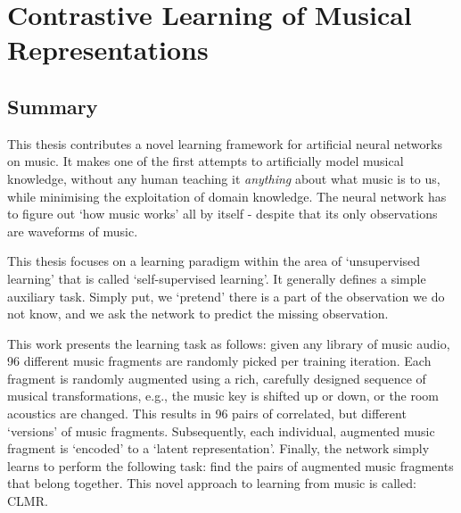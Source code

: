 \chapter*{Contrastive Learning of Musical Representations}
\section*{Summary}

This thesis contributes a novel learning framework for artificial neural networks on music.
It makes one of the first attempts to artificially model musical knowledge, without any human teaching it \textit{anything} about what music is to us, while minimising the exploitation of domain knowledge. The neural network has to figure out `how music works' all by itself - despite that its only observations are waveforms of music.

This thesis focuses on a learning paradigm within the area of `unsupervised learning' that is called `self-supervised learning'.
It generally defines a simple auxiliary task. Simply put, we `pretend' there is a part of the observation we do not know, and we ask the network to predict the missing observation.

This work presents the learning task as follows: given any library of music audio, 96 different music fragments are randomly picked per training iteration. Each fragment is randomly augmented using a rich, carefully designed sequence of musical transformations, e.g., the music key is shifted up or down, or the room acoustics are changed. This results in 96 pairs of correlated, but different `versions' of music fragments. Subsequently, each individual, augmented music fragment is `encoded' to a `latent representation'. Finally, the network simply learns to perform the following task: find the pairs of augmented music fragments that belong together. This novel approach to learning from music is called: CLMR.

